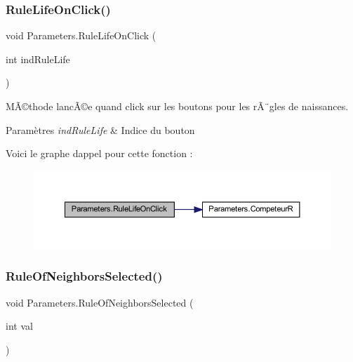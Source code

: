 \subsubsection{\texorpdfstring{Rule\+Life\+On\+Click()}{RuleLifeOnClick()}}
{\footnotesize\ttfamily void Parameters.\+Rule\+Life\+On\+Click (\begin{DoxyParamCaption}\item[{int}]{ind\+Rule\+Life }\end{DoxyParamCaption})\hspace{0.3cm}{\ttfamily [inline]}}



MÃ©thode lancÃ©e quand click sur les boutons pour les rÃ¨gles de naissances. 


\begin{DoxyParams}{Paramètres}
{\em ind\+Rule\+Life} & Indice du bouton\\
\hline
\end{DoxyParams}
Voici le graphe d\textquotesingle{}appel pour cette fonction \+:
\nopagebreak
\begin{figure}[H]
\begin{center}
\leavevmode
\includegraphics[width=350pt]{class_parameters_ae90c0f90420620d98950ac50b9f24782_cgraph}
\end{center}
\end{figure}
\mbox{\label{class_parameters_af47f2d06943667d50ffbc35743ad522c}} 
\subsubsection{\texorpdfstring{Rule\+Of\+Neighbors\+Selected()}{RuleOfNeighborsSelected()}}
{\footnotesize\ttfamily void Parameters.\+Rule\+Of\+Neighbors\+Selected (\begin{DoxyParamCaption}\item[{int}]{val }\end{DoxyParamCaption})\hspace{0.3cm}{\ttfamily [inline]}}




